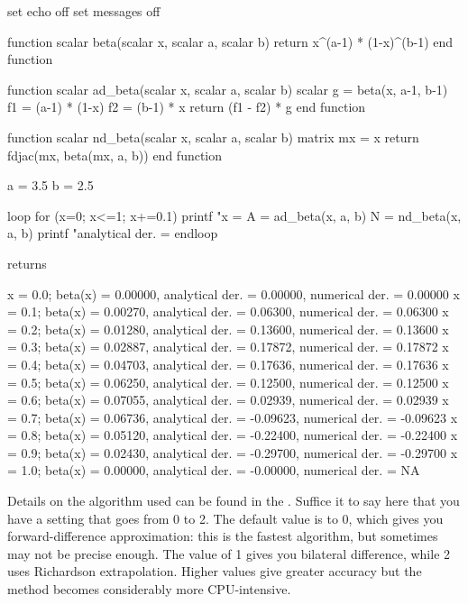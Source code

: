 \begin{code}
set echo off
set messages off

function scalar beta(scalar x, scalar a, scalar b)
    return x^(a-1) * (1-x)^(b-1)
end function

function scalar ad_beta(scalar x, scalar a, scalar b)
    scalar g = beta(x, a-1, b-1)
    f1 = (a-1) * (1-x)
    f2 = (b-1) * x
    return (f1 - f2) * g
end function

function scalar nd_beta(scalar x, scalar a, scalar b)
    matrix mx = {x}
    return fdjac(mx, beta(mx, a, b))
end function

a = 3.5
b = 2.5

loop for (x=0; x<=1; x+=0.1)
    printf "x = %
    A = ad_beta(x, a, b)
    N = nd_beta(x, a, b)
    printf "analytical der. = %
endloop
\end{code}

returns 

\begin{code}
x = 0.0; beta(x) = 0.00000, analytical der. =  0.00000, numerical der. =  0.00000
x = 0.1; beta(x) = 0.00270, analytical der. =  0.06300, numerical der. =  0.06300
x = 0.2; beta(x) = 0.01280, analytical der. =  0.13600, numerical der. =  0.13600
x = 0.3; beta(x) = 0.02887, analytical der. =  0.17872, numerical der. =  0.17872
x = 0.4; beta(x) = 0.04703, analytical der. =  0.17636, numerical der. =  0.17636
x = 0.5; beta(x) = 0.06250, analytical der. =  0.12500, numerical der. =  0.12500
x = 0.6; beta(x) = 0.07055, analytical der. =  0.02939, numerical der. =  0.02939
x = 0.7; beta(x) = 0.06736, analytical der. = -0.09623, numerical der. = -0.09623
x = 0.8; beta(x) = 0.05120, analytical der. = -0.22400, numerical der. = -0.22400
x = 0.9; beta(x) = 0.02430, analytical der. = -0.29700, numerical der. = -0.29700
x = 1.0; beta(x) = 0.00000, analytical der. = -0.00000, numerical der. =       NA
\end{code}

Details on the algorithm used can be found in the \GCR. Suffice it to
say here that you have a  setting that goes
from 0 to 2. The default value is to 0, which gives you
forward-difference approximation: this is the fastest algorithm, but
sometimes may not be precise enough. The value of 1 gives you
bilateral difference, while 2 uses Richardson extrapolation. Higher
values give greater accuracy but the method becomes considerably more
CPU-intensive.




